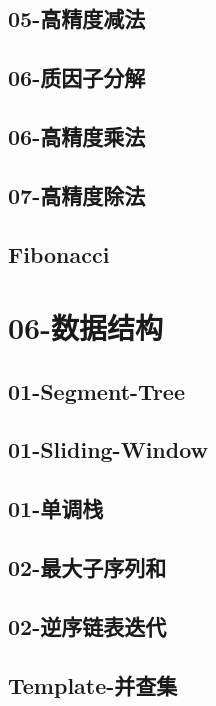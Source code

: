 \documentclass[10pt,a4paper]{article}
\begin{document}
\subsection{05-高精度减法}

\subsection{06-质因子分解}

\subsection{06-高精度乘法}

\subsection{07-高精度除法}

\subsection{Fibonacci}

\section{06-数据结构}
\subsection{01-Segment-Tree}

\subsection{01-Sliding-Window}

\subsection{01-单调栈}

\subsection{02-最大子序列和}

\subsection{02-逆序链表迭代}

\subsection{Template-并查集}

\end{document}
